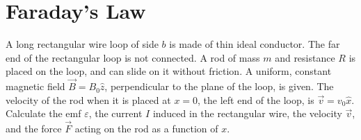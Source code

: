 \documentclass[fleqn, a4paper, 12pt, twoside]{article}
\theoremstyle{definition}
\theoremstyle{theorem}
\begin{document}
\section{Faraday's Law}

\addtocounter{question}{1}

\begin{question}
	A long rectangular wire loop of side $b$ is made of thin ideal conductor.
	The far end of the rectangular loop is not connected.
	A rod of mass $m$ and resistance $R$ is placed on the loop, and can slide on it without friction.
	A uniform, constant magnetic field $\overrightarrow{B} = B_0 \hat{z}$, perpendicular to the plane of the loop, is given.
	The velocity of the rod when it is placed at $x = 0$, the left end of the loop, is $\overrightarrow{v} = v_0 \hat{x}$.\\
	Calculate the emf $\varepsilon$, the current $I$ induced in the rectangular wire, the velocity $\overrightarrow{v}$, and the force $\overrightarrow{F}$ acting on the rod as a function of $x$.
\end{question}
\end{document}
